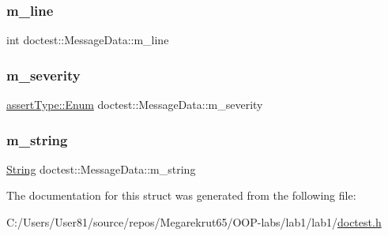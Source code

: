 \mbox{\label{structdoctest_1_1_message_data_a7c1cf03250a68db5befbba63b3824d93}} 
\subsubsection{\texorpdfstring{m\+\_\+line}{m\_line}}
{\footnotesize\ttfamily int doctest\+::\+Message\+Data\+::m\+\_\+line}

\mbox{\label{structdoctest_1_1_message_data_a24e0a3f475609ce8e02cecc4cb0d3b48}} 
\subsubsection{\texorpdfstring{m\+\_\+severity}{m\_severity}}
{\footnotesize\ttfamily \mbox{\hyperlink{namespacedoctest_1_1assert_type_ae1bb5bed722f34f1c38b83cb19d326d3}{assert\+Type\+::\+Enum}} doctest\+::\+Message\+Data\+::m\+\_\+severity}

\mbox{\label{structdoctest_1_1_message_data_a0ef5cfd7a399ee475d6357b6dcddfe53}} 
\subsubsection{\texorpdfstring{m\+\_\+string}{m\_string}}
{\footnotesize\ttfamily \mbox{\hyperlink{classdoctest_1_1_string}{String}} doctest\+::\+Message\+Data\+::m\+\_\+string}



The documentation for this struct was generated from the following file\+:\begin{DoxyCompactItemize}
\item 
C\+:/\+Users/\+User81/source/repos/\+Megarekrut65/\+O\+O\+P-\/labs/lab1/lab1/\mbox{\hyperlink{doctest_8h}{doctest.\+h}}\end{DoxyCompactItemize}

